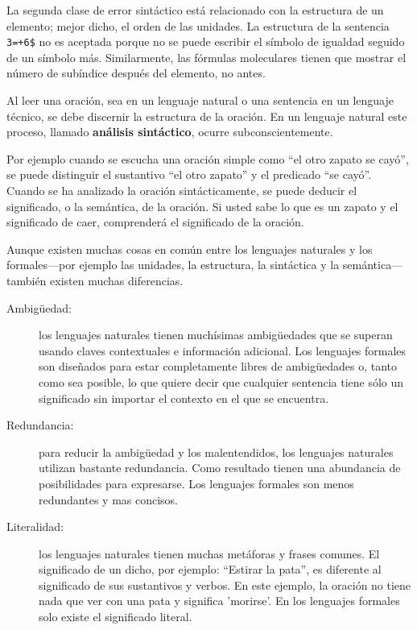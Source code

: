 La segunda clase de error sintáctico está relacionado con la estructura
de un elemento; mejor dicho, el orden de las unidades. La estructura de
la sentencia \texttt{3=+6\$} no es aceptada porque no se puede escribir el
símbolo de igualdad seguido de un símbolo más. Similarmente, las 
fórmulas moleculares tienen que mostrar el número de subíndice después del 
elemento, no antes.

Al leer una oración, sea en un lenguaje natural o una sentencia
en un lenguaje técnico, se debe discernir la estructura de la
oración. En un lenguaje natural este proceso, llamado {\bf
análisis sintáctico}, ocurre subconscientemente.


Por ejemplo cuando se escucha una oración simple como ``el otro zapato
se cayó'', se puede
distinguir el sustantivo ``el otro zapato'' y el predicado ``se cayó''. Cuando se ha analizado la
oración sintácticamente, se puede deducir el significado, o la
semántica, de la oración. Si usted sabe lo que es un zapato y el significado
de caer, comprenderá el significado de la oración.

Aunque existen muchas cosas en común entre los lenguajes naturales y 
los formales---por ejemplo las unidades, la estructura,
la sintáctica y la semántica--- también existen muchas diferencias.


\begin{description}
	\item[Ambigüedad:] los lenguajes naturales tienen muchísimas 
	ambigüedades que se superan usando claves contextuales e información
	adicional.
	Los lenguajes formales son diseñados para estar completamente libres de
	ambigüedades o, tanto como sea posible, lo que quiere decir que 
	cualquier sentencia tiene sólo un significado sin importar el contexto
	en el que se encuentra.
	\item[Redundancia:] para reducir la ambigüedad y los malentendidos,
	los lenguajes naturales utilizan bastante redundancia. Como resultado
	tienen una abundancia de posibilidades para expresarse. Los lenguajes 
	formales son menos redundantes y mas concisos.
	\item[Literalidad:] los lenguajes naturales tienen muchas metáforas
	y frases comunes. El significado de un dicho, por ejemplo: ``Estirar
	la pata'', es diferente al significado de sus sustantivos y
	verbos. En este ejemplo, la oración no tiene nada que ver con una
	pata y significa 'morirse'. En los lenguajes formales solo existe el 
	significado literal.
\end{description}

